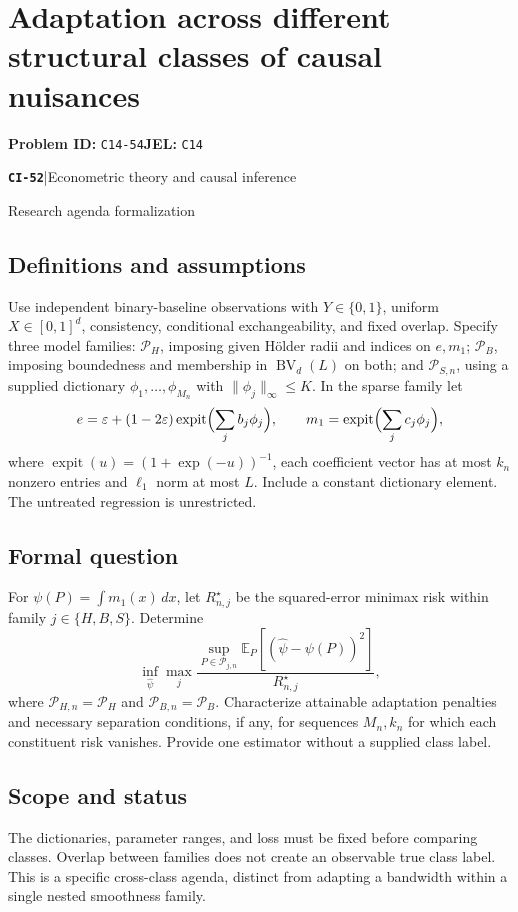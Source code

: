 \documentclass[11pt,a4paper]{article}
\newcommand{\E}{\mathbb E}
\newcommand{\entrymeta}[3]{{\sffamily\small\color{muted}\textbf{\texttt{#1}}\quad|\quad #2\par #3\par}}
\begin{document}
\section*{Adaptation across different structural classes of causal nuisances}
\textbf{Problem ID:} \texttt{C14-54}\quad \textbf{JEL:} \texttt{C14}\par
\label{problem:OP-0531}
\label{beyond:CI-52}
\entrymeta{CI-52}{Econometric theory and causal inference}{Research agenda formalization}
\subsection*{Definitions and assumptions}
Use independent binary-baseline observations with $Y\in\{0,1\}$, uniform $X\in[0,1]^d$, consistency, conditional exchangeability, and fixed overlap. Specify three model families: $\mathcal P_H$, imposing given Hölder radii and indices on $e,m_1$; $\mathcal P_B$, imposing boundedness and membership in $\operatorname{BV}_d(L)$ on both; and $\mathcal P_{S,n}$, using a supplied dictionary $\phi_1,\ldots,\phi_{M_n}$ with $\|\phi_j\|_\infty\leq K$. In the sparse family let
\[
 e=\varepsilon+(1-2\varepsilon)\operatorname{expit}
       \Bigl(\sum_jb_j\phi_j\Bigr),\qquad
 m_1=\operatorname{expit}\Bigl(\sum_jc_j\phi_j\Bigr),
\]
where $\operatorname{expit}(u)=(1+\exp(-u))^{-1}$, each coefficient vector has at most $k_n$ nonzero entries and $\ell_1$ norm at most $L$. Include a constant dictionary element. The untreated regression is unrestricted.
\subsection*{Formal question}
For $\psi(P)=\int m_1(x)\,dx$, let $R_{n,j}^\star$ be the squared-error minimax risk within family $j\in\{H,B,S\}$. Determine
\[
 \inf_{\widehat\psi}\max_j
 \frac{\sup_{P\in\mathcal P_{j,n}}
       \E_P[(\widehat\psi-\psi(P))^2]}{R_{n,j}^\star},
\]
where $\mathcal P_{H,n}=\mathcal P_H$ and $\mathcal P_{B,n}=\mathcal P_B$. Characterize attainable adaptation penalties and necessary separation conditions, if any, for sequences $M_n,k_n$ for which each constituent risk vanishes. Provide one estimator without a supplied class label.
\subsection*{Scope and status}
The dictionaries, parameter ranges, and loss must be fixed before comparing classes. Overlap between families does not create an observable true class label. This is a specific cross-class agenda, distinct from adapting a bandwidth within a single nested smoothness family.
\end{document}
